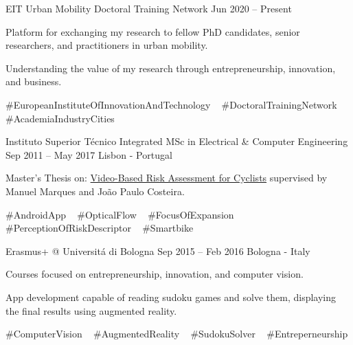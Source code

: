 \begin{cventries}
  \cventryinner
    {EIT Urban Mobility Doctoral Training Network} %
    {Jun 2020 – Present} %
    {} %
    {
      \begin{cvitems} %
        \item {Platform for exchanging my research to fellow PhD candidates, senior researchers, and practitioners in urban mobility.}
        \item {Understanding the value of my research through entrepreneurship, innovation, and business.}
      \end{cvitems}
    }
    {
      \#EuropeanInstituteOfInnovationAndTechnology ~
      \#DoctoralTrainingNetwork ~
      \#AcademiaIndustryCities ~
    }


  \cventry
    {Instituto Superior Técnico} %
    {Integrated MSc in Electrical \& Computer Engineering} %
    {Sep 2011 – May 2017} %
    {Lisbon - Portugal} %
    {
      \begin{cvitems} %
        \item {Master’s Thesis on: \underline{Video-Based Risk Assessment for Cyclists} supervised by Manuel Marques and João Paulo Costeira.}
      \end{cvitems}
    }
    {
      \#AndroidApp ~
      \#OpticalFlow ~
      \#FocusOfExpansion ~
      \#PerceptionOfRiskDescriptor ~
      \#Smartbike ~
    }

  \cventryinner
    {Erasmus+ @ Universitá di Bologna} %
    {Sep 2015 – Feb 2016} %
    {Bologna - Italy} %
    {
    	\begin{cvitems} %
    		\item {Courses focused on entrepreneurship, innovation, and computer vision.}
    		\item {App development capable of reading sudoku games and solve them, displaying the final results using augmented reality.}
    	\end{cvitems}
    }
    {
    	\#ComputerVision ~
    	\#AugmentedReality ~
    	\#SudokuSolver ~
    	\#Entreperneurship ~   	
    }
 
\end{cventries}
